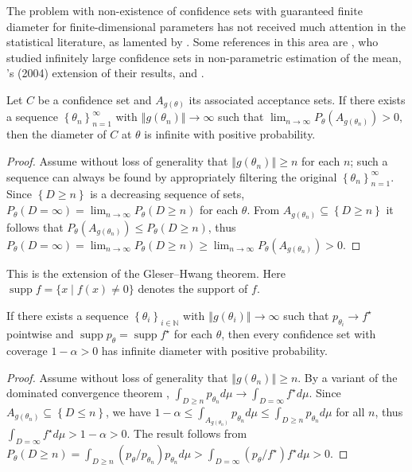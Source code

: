 \documentclass[twoside]{article}
\DeclareMathOperator{\supp}{supp}
\begin{document}
The problem with non-existence
of confidence sets with guaranteed finite diameter for finite-dimensional
parameters has not received much attention in the statistical literature,
as lamented by \citet{gleser996bootstrap}. Some references in this
area are \citet{bahadur1956nonexistence}, who studied infinitely
large confidence sets in non-parametric estimation of the mean, \citeauthor{romano2004non}'s
(2004) extension of their results, \citet{Donoho1988-hg} and \citet{Pfanzagl1998-fe}.
\begin{lem}
Let $C$ be a confidence set and $A_{g(\theta)}$ its associated
acceptance sets. If there exists a sequence $\left\{ \theta_{n}\right\} _{n=1}^{\infty}$
with $\left\Vert g(\theta_{n})\right\Vert \to\infty$ such
that $\lim_{n\to\infty}P_{\theta}(A_{g(\theta_{n})})>0,$then
the diameter of $C$ at $\theta$ is infinite with positive probability.
\end{lem}
\begin{proof}
Assume without loss of generality that $\left\Vert g(\theta_{n})\right\Vert \geq n$
for each $n$; such a sequence can always be found by appropriately
filtering the original $\left\{ \theta_{n}\right\} _{n=1}^{\infty}$.
Since $\left\{ D\geq n\right\} $ is a decreasing sequence of sets,
$P_{\theta}(D=\infty)=\lim_{n\to\infty}P_{\theta}(D\geq n)$
for each $\theta$. From $A_{g(\theta_{n})}\subseteq\left\{ D\geq n\right\} $
it follows that $P_{\theta}(A_{g(\theta_{n})})\leq P_{\theta}(D\geq n)$,
thus $P_{\theta}(D=\infty)=\lim_{n\to\infty}P_{\theta}(D\geq n)\geq\lim_{n\to\infty}P_{\theta}(A_{g(\theta_{n})})>0$.
\end{proof}
This is the extension of the Gleser--Hwang theorem. Here $\supp f = \{x\mid f(x) \neq 0\}$ denotes the support of $f$.
\begin{thm}
\label{thm:Infinite diameter main theorem}If there exists a sequence
$\left\{ \theta_{i}\right\} _{i\in\mathbb{N}}$ with $\left\Vert g(\theta_{i})\right\Vert \to\infty$
such that $p_{\theta_{i}}\to f^{\star}$ pointwise and $\supp p_{\theta}=\supp f^{\star}$
for each $\theta$, then every confidence set with coverage $1-\alpha>0$
has infinite diameter with positive probability.
\end{thm}
\begin{proof}
Assume without loss of generality that $\left\Vert g(\theta_{n})\right\Vert \geq n$.
By a variant of the dominated convergence theorem \citep[Exercise 16.4a]{billingsley1995probability}, $\int_{D\geq n}p_{\theta_{n}}d\mu\to\int_{D=\infty}f^{\star}d\mu$.
Since $A_{g(\theta_{n})}\subseteq\left\{ D\leq n\right\}$, we have 
$1-\alpha\leq\int_{A_{g(\theta_{n})}}p_{\theta_{n}}d\mu\leq\int_{D\geq n}p_{\theta_{n}}d\mu$
for all $n$, thus $\int_{D=\infty}f^{\star}d\mu>1-\alpha>0$. The
result follows from $P_{\theta}(D\geq n)=\int_{D\geq n}(p_{\theta}/p_{\theta_{n}})p_{\theta_{n}}d\mu>\int_{D=\infty}(p_{\theta}/f^{\star})f^{\star}d\mu>0$.
\end{proof}
\end{document}
